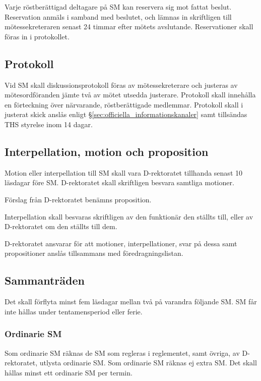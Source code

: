 \documentclass{dgovdoc}
\begin{document}
Varje röstberättigad deltagare på SM kan reservera sig mot fattat beslut.
Reservation anmäls i samband med beslutet, och lämnas in skriftligen till
mötessekreteraren senast 24 timmar efter mötets avslutande. Reservationer skall
föras in i protokollet.

\subsection{Protokoll}

Vid SM skall diskussionsprotokoll föras av mötessekreterare och justeras av
mötesordföranden jämte två av mötet utsedda justerare. Protokoll skall
innehålla en förteckning över närvarande, röstberättigade medlemmar. Protokoll
skall i justerat skick anslås enligt \S\ref{sec:officiella_informationskanaler}
samt tillsändas THS styrelse inom 14 dagar.

\subsection{Interpellation, motion och proposition}

Motion eller interpellation till SM skall vara D-rektoratet tillhanda senast 10
läsdagar före SM. D-rektoratet skall skriftligen besvara samtliga motioner.

Förslag från D-rektoratet benämns proposition.

Interpellation skall besvaras skriftligen av den funktionär den ställts till,
eller av D-rektoratet om den ställts till dem.

D-rektoratet ansvarar för att motioner, interpellationer, svar på dessa samt
propositioner anslås tillsammans med föredragningslistan.

\subsection{Sammanträden}

Det skall förflyta minst fem läsdagar mellan två på varandra följande SM. SM
får inte hållas under tentamensperiod eller ferie.

\subsubsection{Ordinarie SM}
\label{sec:ordinarie_sm}

Som ordinarie SM räknas de SM som regleras i reglementet, samt övriga, av
D-rektoratet, utlysta ordinarie SM. Som ordinarie SM räknas ej extra SM. Det
skall hållas minst ett ordinarie SM per termin.
\end{document}
